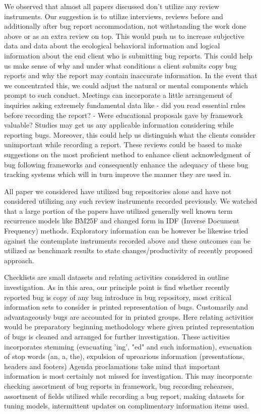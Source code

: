 \documentclass[]{sig-alternate-05-2015}
\begin{document}
We observed that almost all papers discussed don't utilize any review instruments. Our suggestion is to utilize interviews, reviews before and additionally after bug report accommodation, not withstanding the work done above or as an extra review on top. This would push us to increase subjective data and data about the ecological behavioral information and logical information about the end client who is submitting bug reports. This could help us make sense of why and under what conditions a client submits copy bug reports and why the report may contain inaccurate information. In the event that we concentrated this, we could adjust the natural or mental components which prompt to such conduct. Meetings can incorporate a little arrangement of inquiries asking extremely fundamental data like - did you read essential rules before recording the report? - Were educational proposals gave by framework valuable? Studies may get us any applicable information considering while reporting bugs. Moreover, this could help us distinguish what the clients consider unimportant while recording a report. These reviews could be based to make suggestions on the most proficient method to enhance client acknowledgment of bug following frameworks and consequently enhance the adequacy of these bug tracking systems which will in turn improve the
manner they are used in. \newline

All paper we considered have utilized bug repositories alone and have not considered utilizing any such review instruments recorded previously. We watched that a large portion of the papers have utilized generally well known term recurrence models like BM25F and changed form in IDF (Inverse Document Frequency) methods. Exploratory information can be however be likewise tried against the contemplate instruments recorded above and these outcomes can be utilized as benchmark results to state changes/productivity of recently proposed approach. \newline

Checklists are small datasets and relating activities considered in outline investigation. As in this area, our principle point is find whether recently reported bug is copy of any bug introduce in bug repository, most critical information sets to consider is printed representation of bugs. Customarily and advantageously bugs are accounted for in printed groups. Here relating activities would be preparatory beginning methodology where given printed representation of bugs is cleaned and arranged for further investigation. These activities incorporates stemming (evacuating 'ing', "ed" and such information), evacuation of stop words (an, a, the), expulsion of uproarious information (presentations, headers and footers) Agenda proclamations take mind that important information is most certainly not missed for investigation. This may incorporate checking assortment of bug reports in framework, bug recording rehearses, assortment of fields utilized while recording a bug report, making datasets for tuning models, intermittent updates on complimentary information items used. \newline
\end{document}
